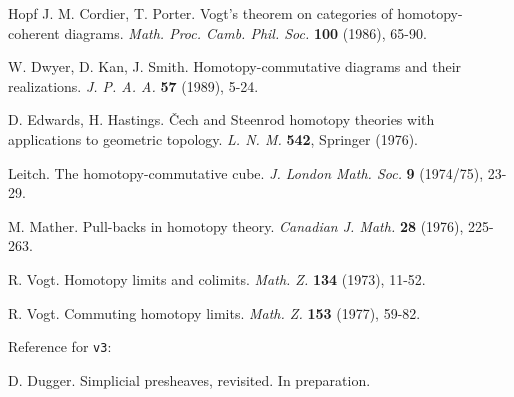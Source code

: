 \begin{thebibliography}{Hopf}
J. M. Cordier, T. Porter. Vogt's theorem on categories of homotopy-coherent
diagrams. {\em Math. Proc. Camb. Phil. Soc.} {\bf 100} (1986), 65-90.

W. Dwyer, D. Kan, J. Smith. Homotopy-commutative diagrams and their
realizations. {\em J. P. A. A.} {\bf 57} (1989), 5-24.

D. Edwards, H. Hastings. \v{C}ech and Steenrod homotopy theories with
applications to geometric topology. {\em L. N. M.} {\bf 542},
Springer (1976).

Leitch. The homotopy-commutative cube. {\em J. London Math. Soc.}
{\bf 9} (1974/75), 23-29.

M. Mather. Pull-backs in homotopy theory. {\em Canadian J. Math.} {\bf 28}
(1976), 225-263.

R. Vogt. Homotopy limits and colimits. {\em Math. Z.} {\bf 134}
(1973), 11-52.

R. Vogt. Commuting homotopy limits. {\em Math. Z.} {\bf 153} (1977), 59-82.

Reference for {\tt v3}:

D. Dugger. Simplicial presheaves, revisited. In preparation.

\end{thebibliography}
